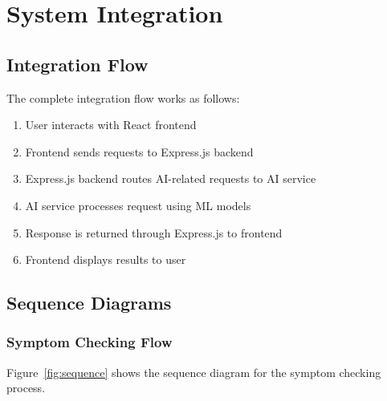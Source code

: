 \documentclass[12pt,a4paper]{article}
\begin{document}
\section{System Integration}

\subsection{Integration Flow}
The complete integration flow works as follows:

\begin{enumerate}
    \item User interacts with React frontend
    \item Frontend sends requests to Express.js backend
    \item Express.js backend routes AI-related requests to AI service
    \item AI service processes request using ML models
    \item Response is returned through Express.js to frontend
    \item Frontend displays results to user
\end{enumerate}

\subsection{Sequence Diagrams}

\subsubsection{Symptom Checking Flow}
Figure~\ref{fig:sequence} shows the sequence diagram for the symptom checking process.
\end{document}
